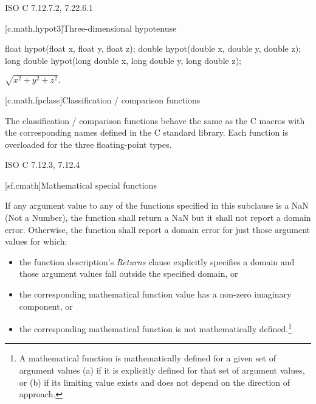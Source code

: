 \xref ISO C 7.12.7.2, 7.22.6.1

[c.math.hypot3]{Three-dimensional hypotenuse}

%
\begin{itemdecl}
float hypot(float x, float y, float z);
double hypot(double x, double y, double z);
long double hypot(long double x, long double y, long double z);
\end{itemdecl}

\begin{itemdescr}
\pnum
\returns $\sqrt{x^2+y^2+z^2} \mbox{.}$
\end{itemdescr}

[c.math.fpclass]{Classification / comparison functions}

\pnum
The classification / comparison functions behave the same as the C macros with the
corresponding names defined in the C standard library.
Each function is overloaded for the three floating-point types.

\xref
ISO C 7.12.3, 7.12.4

[sf.cmath]{Mathematical special functions}%
%

\pnum{}%
If any argument value
to any of the functions specified in this subclause
is a NaN (Not a Number),
the function shall return a NaN
but it shall not report a domain error.
Otherwise,
the function shall report a domain error
for just those argument values
for which:

\begin{itemize}
  \item
  the function description's \emph{Returns} clause
  explicitly specifies a domain
  and those argument values fall
  outside the specified domain,
  or

  \item
  the corresponding mathematical function value
  has a non-zero imaginary component,
  or

  \item
  the corresponding mathematical function
  is not mathematically defined.\footnote{%
    A mathematical function
    is mathematically defined
    for a given set of argument values
    (a)
      if it is explicitly defined
      for that set of argument values,
      or
    (b)
      if its limiting value exists
      and does not depend
      on the direction of approach.}
\end{itemize}

